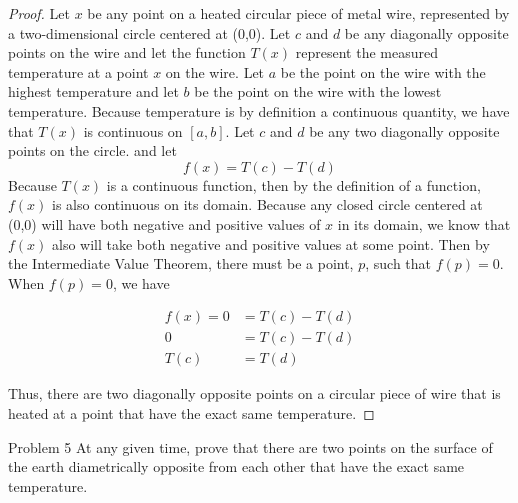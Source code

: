 \documentclass{article}
\begin{document}
    \begin{proof}
        Let $x$ be any point on a heated circular piece of metal wire, represented by a two-dimensional circle centered at (0,0). Let $c$ and $d$ be any diagonally opposite points on the wire and let the function $T(x)$
        represent the measured temperature at a point $x$ on the wire. Let $a$ be the point on the wire with the highest temperature and let $b$ be the point on the wire with the lowest temperature.
        Because temperature is by definition a continuous quantity, we have that $T(x)$ is continuous on $[a,b]$. Let $c$ and $d$ be any two diagonally opposite points on the circle. and let
        \[
            f(x) = T(c) - T(d)
        \]
        Because $T(x)$ is a continuous function, then by the definition of a function, $f(x)$ is also continuous on its domain. Because any closed circle centered at (0,0) will have both negative and positive values
        of $x$ in its domain, we know that $f(x)$ also will take both negative and positive values at some point. Then by the Intermediate Value Theorem, there must be a point, $p$, such that $f(p)=0$. When $f(p)=0$, we
        have

        \begin{align*}
            f(x) = 0    &= T(c) - T(d) \\
                   0    &= T(c) - T(d) \\
                 T(c)   &= T(d)
        \end{align*}

        Thus, there are two diagonally opposite points on a circular piece of wire that is heated at a point that have the exact same temperature.
    \end{proof}

    \begin{tbhtheorem}{Problem 5}
        At any given time, prove that there are two points on the surface of the earth diametrically opposite from each other that have the exact same temperature.
    \end{tbhtheorem}
\end{document}
